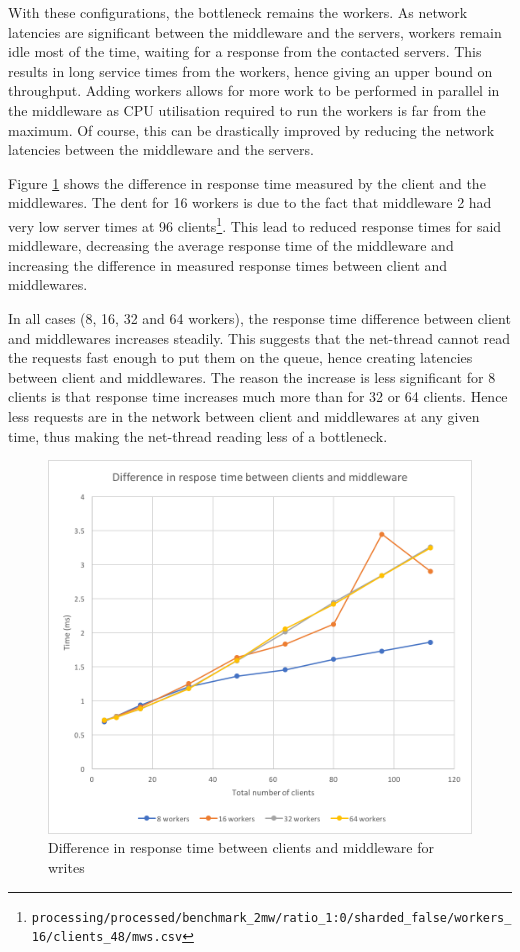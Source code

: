 \documentclass[11pt,a4paper]{article}
\begin{document}
With these configurations, the bottleneck remains the workers. As network latencies are significant between the middleware and the servers, workers remain idle most of the time, waiting for a response from the contacted servers. This results in long service times from the workers, hence giving an upper bound on throughput. Adding workers allows for more work to be performed in parallel in the middleware as CPU utilisation required to run the workers is far from the maximum. Of course, this can be drastically improved by reducing the network latencies between the middleware and the servers.

Figure \ref{png::bench_2mw_netlat_writes} shows the difference in response time measured by the client and the middlewares. The dent for 16 workers is due to the fact that middleware 2 had very low server times at 96 clients\footnote{\texttt{processing/processed/benchmark_2mw/ratio_1:0/sharded_false/workers_16/clients_48/mws.csv}}. This lead to reduced response times for said middleware, decreasing the average response time of the middleware and increasing the difference in measured response times between client and middlewares.

In all cases (8, 16, 32 and 64 workers), the response time difference between client and middlewares increases steadily. This suggests that the net-thread cannot read the requests fast enough to put them on the queue, hence creating latencies between client and middlewares. The reason the increase is less significant for 8 clients is that response time increases much more than for 32 or 64 clients. Hence less requests are in the network between client and middlewares at any given time, thus making the net-thread reading less of a bottleneck.

\begin{figure}[!h]
    \centering
    \includegraphics[width=.45\textwidth]{processing/graphics/bench_2mw_netlat_writes.png}
    \caption{Difference in response time between clients and middleware for writes}
    \label{png::bench_2mw_netlat_writes}
\end{figure}
\end{document}
